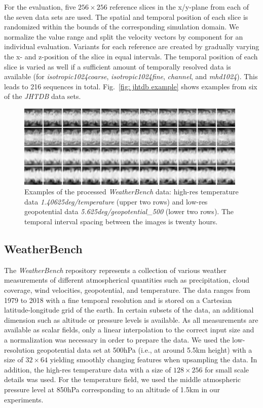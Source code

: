 For the evaluation, five $256\times256$ reference slices in the x/y-plane from each of the seven data sets are used. The spatial and temporal position of each slice is randomized within the bounds of the corresponding simulation domain. We normalize the value range and split the velocity vectors by component for an individual evaluation. Variants for each reference are created by gradually varying the x- and z-position of the slice in equal intervals. The temporal position of each slice is varied as well if a sufficient amount of temporally resolved data is available (for \textit{isotropic1024coarse}, \textit{isotropic1024fine}, \textit{channel}, and \textit{mhd1024}). This leads to 216 sequences in total. Fig.~\ref{fig: jhtdb example} shows examples from six of the \textit{JHTDB} data sets.

\begin{figure}[htp]
    \centering
    \includegraphics[width=0.98\textwidth]{ImagesDatasets/WeatherBenchDefault_small}
    \caption{Examples of the processed \textit{WeatherBench} data: high-res temperature data \textit{1.40625deg/temperature} (upper two rows) and low-res geopotential data \textit{5.625deg/geopotential\_500} (lower two rows). The temporal interval spacing between the images is twenty hours.}
    \label{fig: weatherBench example}
\end{figure}

\subsection{WeatherBench}
The \textit{WeatherBench} repository \cite{rasp2020} represents a collection of various weather measurements of different atmospherical quantities such as precipitation, cloud coverage, wind velocities, geopotential, and temperature. The data ranges from 1979 to 2018 with a fine temporal resolution and is stored on a Cartesian latitude-longitude grid of the earth. In certain subsets of the data, an additional dimension such as altitude or pressure levels is available. As all measurements are available as scalar fields, only a linear interpolation to the correct input size and a normalization was necessary in order to prepare the data.
We used the low-resolution geopotential data set at 500hPa (i.e., at around 5.5km height) with a size of $32\times64$ yielding smoothly changing features when upsampling the data. 
In addition, the high-res temperature data with a size of $128\times256$ for small scale details was used. For the temperature field, we used the middle atmospheric pressure level at 850hPa corresponding to an altitude of 1.5km in our experiments.

